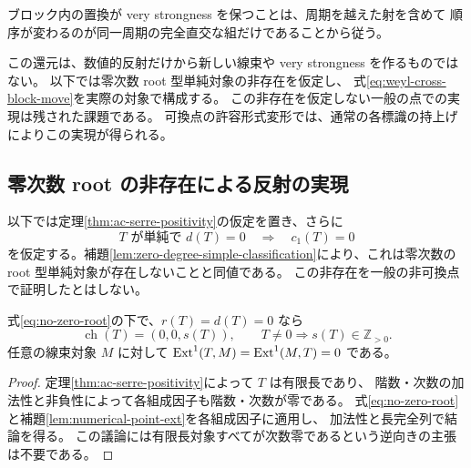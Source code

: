 ブロック内の置換が very strongness を保つことは、周期を越えた射を含めて
順序が変わるのが同一周期の完全直交な組だけであることから従う。

この還元は、数値的反射だけから新しい線束や very strongness を作るものではない。
以下では零次数 root 型単純対象の非存在を仮定し、
式\eqref{eq:weyl-cross-block-move}を実際の対象で構成する。
この非存在を仮定しない一般の点での実現は残された課題である。
可換点の許容形式変形では、通常の各標識の持上げによりこの実現が得られる。

\subsection{零次数 root の非存在による反射の実現}

以下では定理\ref{thm:ac-serre-positivity}の仮定を置き、さらに
\begin{equation}\label{eq:no-zero-root}
 T\text{ が単純で }d(T)=0\quad\Longrightarrow\quad c_1(T)=0
 \tag{R0}
\end{equation}
を仮定する。補題\ref{lem:zero-degree-simple-classification}により、これは零次数の
root 型単純対象が存在しないことと同値である。
この非存在を一般の非可換点で証明したとはしない。

\begin{lemma}\label{lem:zero-degree-point-type}
式\eqref{eq:no-zero-root}の下で、$r(T)=d(T)=0$ なら
\[
 \operatorname{ch}(T)=(0,0,s(T)),\qquad
 T\ne0\Longrightarrow s(T)\in\mathbb Z_{>0}.
\]
任意の線束対象 $M$ に対して
$\operatorname{Ext}^1(T,M)=\operatorname{Ext}^1(M,T)=0$ である。
\end{lemma}
\begin{proof}
定理\ref{thm:ac-serre-positivity}によって $T$ は有限長であり、
階数・次数の加法性と非負性によって各組成因子も階数・次数が零である。
式\eqref{eq:no-zero-root}と補題\ref{lem:numerical-point-ext}を各組成因子に適用し、
加法性と長完全列で結論を得る。
この議論には有限長対象すべてが次数零であるという逆向きの主張は不要である。
\end{proof}

